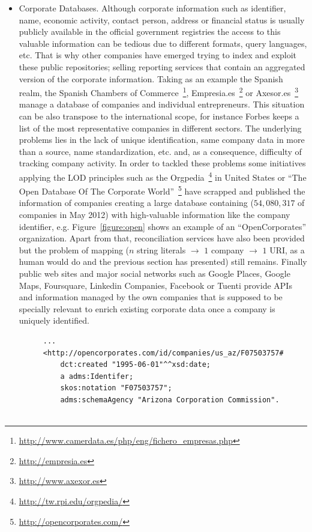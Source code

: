 \documentclass{llncs}
\begin{document}
\begin{itemize}
 
 \item Corporate Databases. Although corporate information such as identifier, name, economic activity, contact person, address or 
 financial status is usually publicly available in the official government registries the access to this valuable information can be 
 tedious due to different formats, query languages, etc. That is why other companies have emerged trying to index and exploit 
 these public repositories; selling reporting services that contain an aggregated version of the corporate information. Taking as 
 an example the Spanish realm, the Spanish Chambers of Commerce~\footnote{\url{http://www.camerdata.es/php/eng/fichero\_empresas.php}},
 Empresia.es~\footnote{\url{http://empresia.es}} or Axesor.es~\footnote{\url{http://www.axexor.es}} manage a database of companies and individual 
 entrepreneurs. This situation can be also transpose to the international scope, for instance Forbes keeps a list of 
 the most representative companies in different sectors. The underlying problems lies in the lack of unique identification, same company data in more 
 than a source, name standardization, etc. and, as a consequence, difficulty of tracking company activity. In order to tackled these problems some 
 initiatives applying the LOD principles such as the Orgpedia~\footnote{\url{http://tw.rpi.edu/orgpedia/}} in United States or 
 ``The Open Database Of The Corporate World''~\footnote{\url{http://opencorporates.com/}} have scrapped and published the information 
 of companies creating a large database containing ($54,080,317$ of companies in May 2012) with high-valuable information like the company 
 identifier, e.g. Figure~\ref{figure:open} shows an example of an ``OpenCorporates'' organization. Apart from that, reconciliation services have also been provided but the problem of mapping ($n$ string literals $\to$ $1$ company $\to$ $1$ URI, 
 as a human would do and the previous section has presented) still remains. Finally public web sites and major social networks such as Google 
 Places, Google Maps, Foursquare, Linkedin Companies, Facebook or Tuenti provide APIs and information managed by the own companies that is supposed 
 to be specially relevant to enrich existing corporate data once a company is uniquely identified.
 
  
\clearpage

\begin{figure}[!h]
\begin{center}
\begin{lstlisting}[language=SPARQL]
...
<http://opencorporates.com/id/companies/us_az/F07503757#id> 
	dct:created "1995-06-01"^^xsd:date;
	a adms:Identifer;
	skos:notation "F07503757";
	adms:schemaAgency "Arizona Corporation Commission".


\end{lstlisting}
\end{center}
\end{figure}
\end{itemize}
\end{document}
